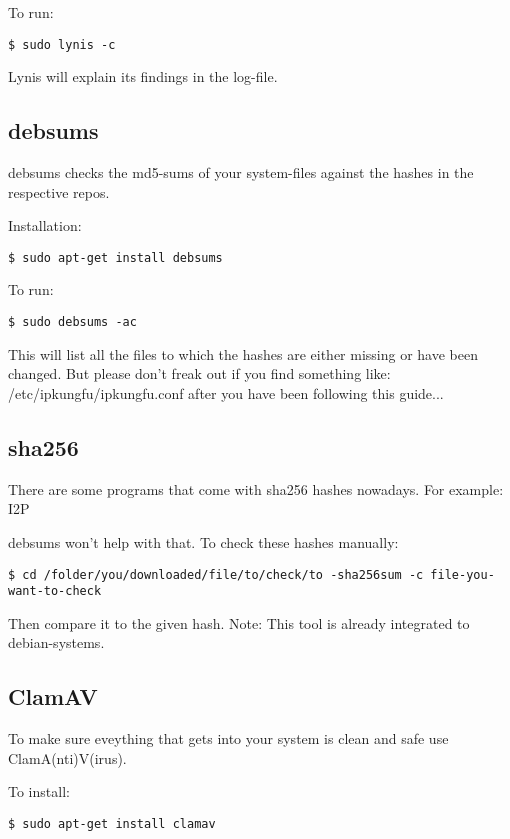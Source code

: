 \documentclass{article}
\begin{document}
 To run:
\begin{lstlisting}
$ sudo lynis -c
\end{lstlisting}



 Lynis will explain its findings in the log-file.
\subsection{debsums}


 debsums checks the md5-sums of your system-files against the hashes in the respective repos. 


 Installation: 
\begin{lstlisting}
$ sudo apt-get install debsums
\end{lstlisting}



 To run:
\begin{lstlisting}
$ sudo debsums -ac 
\end{lstlisting}



 This will list all the files to which the hashes are either missing or have been changed. But please don't freak out if you find something like: /etc/ipkungfu/ipkungfu.conf after you have been following this guide... 
\subsection{sha256}


 There are some programs that come with sha256 hashes nowadays. For example: I2P


 debsums won't help with that. To check these hashes manually:
\begin{lstlisting}
$ cd /folder/you/downloaded/file/to/check/to -sha256sum -c file-you-want-to-check
\end{lstlisting}



 Then compare it to the given hash. Note: This tool is already integrated to debian-systems.
\subsection{ClamAV}


 To make sure eveything that gets into your system is clean and safe use ClamA(nti)V(irus).


 To install:
\begin{lstlisting}
$ sudo apt-get install clamav
\end{lstlisting}
\end{document}
